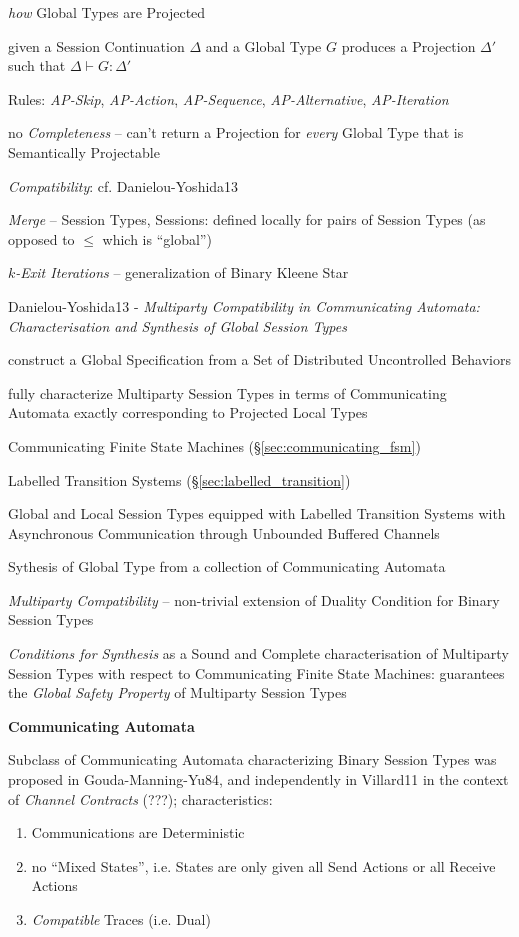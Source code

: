 \emph{how} Global Types are Projected

given a Session Continuation $\Delta$ and a Global Type $G$ produces a
Projection $\Delta'$ such that $\Delta \vdash G : \Delta'$

Rules: \emph{AP-Skip}, \emph{AP-Action}, \emph{AP-Sequence},
\emph{AP-Alternative}, \emph{AP-Iteration}

no \emph{Completeness} -- can't return a Projection for \emph{every}
Global Type that is Semantically Projectable

\emph{Compatibility}: cf. Danielou-Yoshida13 %

\emph{Merge} -- Session Types, Sessions: defined locally for pairs of
Session Types (as opposed to $\leq$ which is ``global'')

\emph{$k$-Exit Iterations} -- generalization of Binary Kleene Star


\asterism


Danielou-Yoshida13 - \emph{Multiparty Compatibility in Communicating
  Automata: Characterisation and Synthesis of Global Session Types}

construct a Global Specification from a Set of Distributed
Uncontrolled Behaviors

fully characterize Multiparty Session Types in terms of Communicating
Automata exactly corresponding to Projected Local Types

Communicating Finite State Machines (\S\ref{sec:communicating_fsm})

Labelled Transition Systems (\S\ref{sec:labelled_transition})

Global and Local Session Types equipped with Labelled Transition
Systems with Asynchronous Communication through Unbounded Buffered
Channels

Sythesis of Global Type from a collection of Communicating Automata

\emph{Multiparty Compatibility} -- non-trivial extension of Duality
Condition for Binary Session Types

\emph{Conditions for Synthesis} as a Sound and Complete
characterisation of Multiparty Session Types with respect to
Communicating Finite State Machines: guarantees the \emph{Global
  Safety Property} of Multiparty Session Types


\textbf{Communicating Automata}

Subclass of Communicating Automata characterizing Binary Session Types
was proposed in Gouda-Manning-Yu84, and independently in Villard11 in
the context of \emph{Channel Contracts} (???); characteristics:
\begin{enumerate}
  \item Communications are Deterministic
  \item no ``Mixed States'', i.e. States are only given all Send
    Actions or all Receive Actions
  \item \emph{Compatible} Traces (i.e. Dual)
\end{enumerate}

